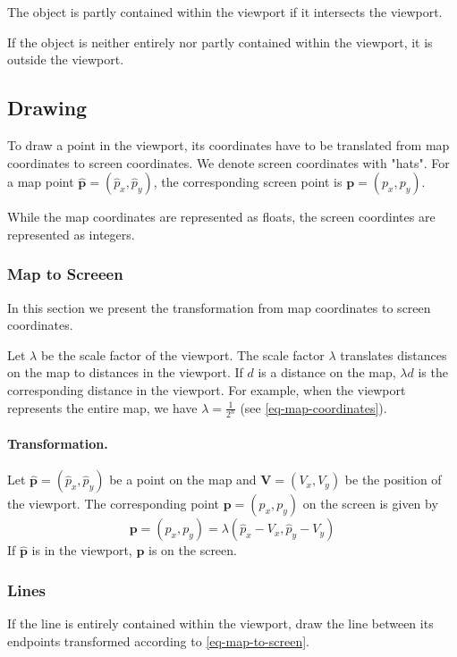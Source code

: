 \documentclass[11pt]{article}
\newcommand{\pb}{\mathbf{p}}
\newcommand{\pbhat}{\hat{\mathbf{p}}}
\newcommand{\phat}{\hat{p}}
\newcommand{\Vb}{\mathbf{V}}
\begin{document}
The object is partly contained within the viewport if it intersects the
viewport.

If the object is neither entirely nor partly contained within the viewport, it
is outside the viewport.

\subsection{Drawing}
\label{sec-map-drawing}

To draw a point in the viewport, its coordinates have to be
translated from map coordinates to screen coordinates. We denote screen
coordinates with "hats". For a map point $\pbhat=(\phat_{x}, \phat_{y})$, the
corresponding screen point is $\pb=(p_{x}, p_{y})$.

While the map coordinates are represented as floats, the screen coordintes are
represented as integers.

\subsubsection{Map to Screeen}
\label{sec-map-drawing-to-screen}
In this section we present the transformation from map coordinates to screen
coordinates.


Let $\lambda$ be the scale factor of the viewport.
The scale factor $\lambda$ translates distances on the map to
distances in the viewport. If $d$ is a distance on the map, $\lambda d$ is the
corresponding distance in the viewport. For example, when the viewport
represents the entire map, we have $\lambda = \frac{1}{2^{n}}$ (see
\eqref{eq-map-coordinates}).

\paragraph{Transformation.}
Let $\pbhat=(\phat_{x}, \phat_{y})$ be a point on the map and
$\Vb=(V_{x}, V_{y})$ be the position of the viewport. The corresponding point
$\pb=(p_{x}, p_{y})$ on the screen is given by
\begin{equation}
    \pb = (p_{x}, p_{y})  = \lambda(\phat_{x} - V_{x}, \phat_{y} - V_{y})
    \label{eq-map-to-screen}
\end{equation}
If $\pbhat$ is in the viewport, $\pb$ is on the screen.

\subsubsection{Lines}
\label{sec-map-drawing-lines}
If the line is entirely contained within the viewport, draw the line between
its endpoints transformed according to \eqref{eq-map-to-screen}.
\end{document}
